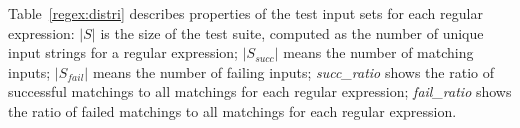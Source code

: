 Table~\ref{regex:distri} describes properties of the test input sets for each regular expression: \emph{$\lvert S \rvert$} is the size of the test suite, computed as the number of unique input strings for a regular expression; $\lvert S_{succ} \rvert$ means the number of matching inputs; $\lvert S_{fail} \rvert$ means the number of failing inputs; \emph{succ_ratio} shows the ratio of successful matchings to all matchings for each regular expression; \emph{fail_ratio} shows the ratio of failed matchings to all matchings for each regular expression. 


